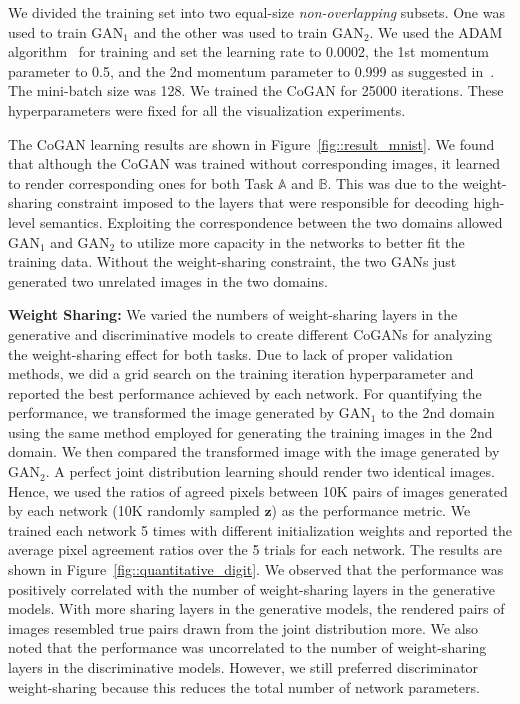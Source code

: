 \documentclass{article}
\begin{document}
We divided the training set into two equal-size {\it non-overlapping} subsets. One was used to train $\text{GAN}_1$ and the other was used to train $\text{GAN}_2$. We used the ADAM algorithm~\cite{kingma2014adam} for training and set the learning rate to 0.0002, the 1st momentum parameter to 0.5, and the 2nd momentum parameter to 0.999 as suggested in~\cite{radford2015unsupervised}. The mini-batch size was 128. We trained the CoGAN for 25000 iterations. These hyperparameters were fixed for all the visualization experiments. 

The CoGAN learning results are shown in Figure~\ref{fig::result_mnist}. We found that although the CoGAN was trained without corresponding images, it learned to render corresponding ones for both Task $\mathbb{A}$ and $\mathbb{B}$. This was due to the weight-sharing constraint imposed to the layers that were responsible for decoding high-level semantics. Exploiting the correspondence between the two domains allowed $\text{GAN}_1$ and $\text{GAN}_2$ to utilize more capacity in the networks to better fit the training data. Without the weight-sharing constraint, the two GANs just generated two unrelated images in the two domains.

{\bf Weight Sharing:} We varied the numbers of weight-sharing layers in the generative and discriminative models to create different CoGANs for analyzing the weight-sharing effect for both tasks. Due to lack of proper validation methods, we did a grid search on the training iteration hyperparameter and reported the best performance achieved by each network. For quantifying the performance, we transformed the image generated by $\text{GAN}_1$ to the 2nd domain using the same method employed for generating the training images in the 2nd domain. We then compared the transformed image with the image generated by $\text{GAN}_2$. A perfect joint distribution learning should render two identical images. Hence, we used the ratios of agreed pixels between 10K pairs of images generated by each network (10K randomly sampled $\mathbf{z}$) as the performance metric. We trained each network 5 times with different initialization weights and reported the average pixel agreement ratios over the 5 trials for each network. The results are shown in Figure~\ref{fig::quantitative_digit}. We observed that the performance was positively correlated with the number of weight-sharing layers in the generative models. With more sharing layers in the generative models, the rendered pairs of images resembled true pairs drawn from the joint distribution more. We also noted that the performance was uncorrelated to the number of weight-sharing layers in the discriminative models. However, we still preferred discriminator weight-sharing because this reduces the total number of network parameters.
\end{document}

